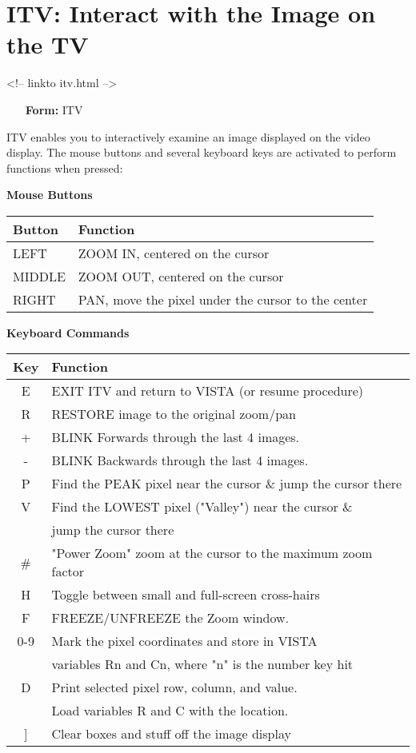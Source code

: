 \section{ITV: Interact with the Image on the TV}
\begin{rawhtml}
<!-- linkto itv.html -->
\end{rawhtml}
\begin{itemize}
  \item[\textbf{Form: }ITV\hfill]{}
\end{itemize}

ITV enables you to interactively examine an image displayed on the video
display.  The mouse buttons and several keyboard keys are activated to
perform functions when pressed:

\begin{center}
{\bf Mouse Buttons}\\
\begin{tabular}{ll}
\hline
Button & Function\\
\hline
LEFT  &ZOOM IN, centered on the cursor\\
MIDDLE&ZOOM OUT, centered on the cursor\\
RIGHT &PAN, move the pixel under the cursor to the center\\
\hline
\end{tabular}
\end{center}

\begin{center}
{\bf Keyboard Commands}\\
\begin{tabular}{cl}
\hline
Key & Function\\
\hline
 E &EXIT ITV and return to VISTA (or resume procedure)\\
 R &RESTORE image to the original zoom/pan\\
 + &BLINK Forwards through the last 4 images.\\
 - &BLINK Backwards through the last 4 images.\\
 P &Find the PEAK pixel near the cursor \& jump the cursor there\\
 V &Find the LOWEST pixel ("Valley") near the cursor \& \\
   &jump the cursor there\\
 \# &"Power Zoom" zoom at the cursor to the maximum zoom factor\\
 H &Toggle between small and full-screen cross-hairs\\
 F &FREEZE/UNFREEZE the Zoom window.\\
0-9&Mark the pixel coordinates and store in VISTA\\
   &variables Rn and Cn, where "n" is the number key hit\\
 D &Print selected pixel row, column, and value.\\
   &Load variables R and C with the location.\\
 ] &Clear boxes and stuff off the image display\\
\hline
\end{tabular}
\end{center}

